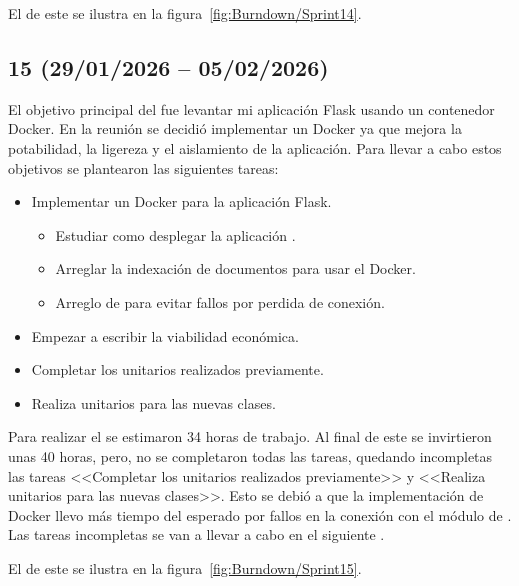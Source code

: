 El  de este  se ilustra en la figura~\ref{fig:Burndown/Sprint14}.

\subsection{ 15 (29/01/2026 -- 05/02/2026)}
El objetivo principal del  fue levantar mi aplicación Flask usando un contenedor Docker. En la reunión se decidió implementar un Docker ya que mejora la potabilidad, la ligereza y el aislamiento de la aplicación. Para llevar a cabo estos objetivos se plantearon las siguientes tareas:
\begin{itemize}
\tightlist
	\item Implementar un Docker para la aplicación Flask.
	\begin{itemize}
	\tightlist
		\item Estudiar como desplegar la aplicación .
		\item Arreglar la indexación de documentos para usar el Docker.
		\item Arreglo de  para evitar fallos por perdida de conexión.
	\end{itemize}
	\item Empezar a escribir la viabilidad económica.
	\item Completar los  unitarios realizados previamente.
	\item Realiza  unitarios para las nuevas clases.
\end{itemize}

Para realizar el  se estimaron 34 horas de trabajo. Al final de este  se invirtieron unas 40 horas, pero, no se completaron todas las tareas, quedando incompletas las tareas <<Completar los  unitarios realizados previamente>> y <<Realiza  unitarios para las nuevas clases>>. Esto se debió a que la implementación de Docker llevo más tiempo del esperado por fallos en la conexión con el módulo de . Las tareas incompletas se van a llevar a cabo en el siguiente .

El  de este  se ilustra en la figura~\ref{fig:Burndown/Sprint15}.


